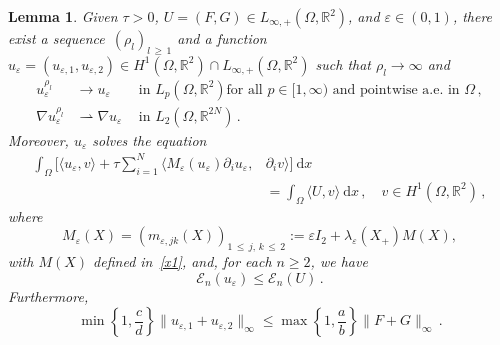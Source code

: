 \documentclass[10pt]{amsart}
\newtheorem{lemm}[theo]{Lemma}\newtheorem{prop}[theo]{Proposition}\newtheorem{coro}[theo]{Corollary}\newtheorem{conj}[theo]{Conjecture}
\theoremstyle{definition}\newtheorem{defi}[theo]{Definition}\newtheorem{rema}[theo]{Remark}\newtheorem{exam}[theo]{Example}\newtheorem{exem}[theo]{Example}\newtheorem{nota}[theo]{Notation}
\newcommand{\bbR}{\mathbb{R}}
\newcommand{\clE}{\mathcal{E}}
\newcommand{\rmd}{\mathrm{d}}
\begin{document}
\begin{lemm}\label{lem.ex3}
Given $\tau>0$, $U=(F,G)\in L_{\infty,+}(\Omega,\bbR^2)$, and $\varepsilon\in (0,1)$, there exist a sequence~$(\rho_l)_{l\,\ge\,1}$ and a function~${u_{\varepsilon} = (u_{\varepsilon,1}, u_{\varepsilon,2}) \in H^1(\Omega,\bbR^2)\cap L_{\infty,+}(\Omega,\bbR^2)}$ such that $\rho_l\to\infty$ and
\begin{align}
u_\varepsilon^{\rho_l}&\to u_\varepsilon\qquad\text{in }L_p\left(\Omega,\bbR^2\right) \text{for all }p\in [1,\infty)\text{ and pointwise a.e. in }\Omega\,,\label{conv1}
\\[1ex]
\nabla u_\varepsilon^{\rho_l}&\rightharpoonup \nabla u_\varepsilon\quad\, \text{in }L_2\left(\Omega,\bbR^{2N}\right)\,.\label{conv3}
\end{align}
Moreover, $u_\varepsilon$ solves the equation
\begin{align}
\int_\Omega \bigg[\langle u_{\varepsilon}, v \rangle + \tau \sum_{i=1}^N\big\langle M_{\varepsilon}(u_{\varepsilon}) \partial_i u_{\varepsilon}, &\partial_i v \big\rangle \bigg]\ \rmd x \label{ex12aa}\\
&=\int_\Omega \langle U, v \rangle\ \rmd x\,, \quad v\in H^1\left(\Omega,\bbR^2\right)\,, \nonumber
\end{align}
where
\begin{equation*}
M_{\varepsilon}(X) = \left(m_{\varepsilon, jk}(X)\right)_{1\,\le\,j,\,k\,\le\,2}:= \varepsilon I_2 + \lambda_\varepsilon(X_{+}) M(X),
\end{equation*}
with $M(X)$ defined in~\eqref{x1}, and, for each $n\ge 2$, we have
\begin{equation}\label{ex12ba}
\clE_n(u_\varepsilon)\le \clE_n(U)\,. 
\end{equation}
Furthermore,
\begin{equation}\label{ex12bac}
\min\left\{ 1, \frac{c}{d}\right\} \|u_{\varepsilon,1}+u_{\varepsilon,2}\|_\infty \le \max\left\{1,\frac{a}{b} \right\}\|F+G\|_\infty\,. 
\end{equation}
\end{lemm}
\end{document}
